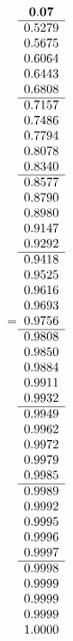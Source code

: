 =\hbox{$\begin{array}{c}
\bf 0.07 
 \\ \hline 
  0.5279 \\ 
  0.5675 \\ 
  0.6064 \\ 
  0.6443 \\ 
  0.6808
 \\ \hline 
  0.7157 \\ 
  0.7486 \\ 
  0.7794 \\ 
  0.8078 \\ 
  0.8340
 \\ \hline 
  0.8577 \\ 
  0.8790 \\ 
  0.8980 \\ 
  0.9147 \\ 
  0.9292
 \\ \hline 
  0.9418 \\ 
  0.9525 \\ 
  0.9616 \\ 
  0.9693 \\ 
  0.9756
 \\ \hline 
  0.9808 \\ 
  0.9850 \\ 
  0.9884 \\ 
  0.9911 \\ 
  0.9932
 \\ \hline 
  0.9949 \\ 
  0.9962 \\ 
  0.9972 \\ 
  0.9979 \\ 
  0.9985
 \\ \hline 
  0.9989 \\ 
  0.9992 \\ 
  0.9995 \\ 
  0.9996 \\ 
  0.9997
 \\ \hline 
  0.9998 \\ 
  0.9999 \\ 
  0.9999 \\ 
  0.9999 \\ 
  1.0000
 \end{array}$}

